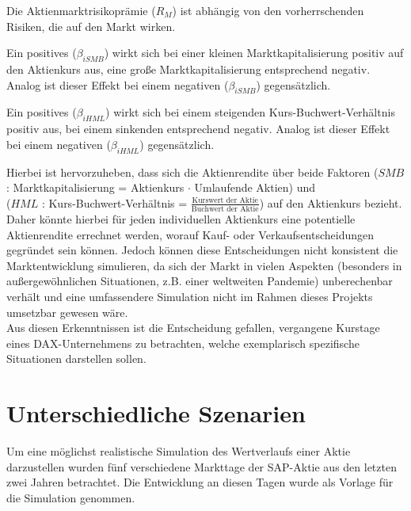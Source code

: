Die Aktienmarktrisikoprämie ($R_M$) ist abhängig von den vorherrschenden Risiken, die auf den Markt wirken. 

Ein positives ($\beta_{iSMB}$) wirkt sich bei einer kleinen Marktkapitalisierung positiv auf den Aktienkurs aus, eine große Marktkapitalisierung entsprechend negativ. Analog ist dieser Effekt bei einem negativen ($\beta_{iSMB}$) gegensätzlich.

Ein positives ($\beta_{iHML}$) wirkt sich bei einem steigenden Kurs-Buchwert-Verhältnis positiv aus, bei einem sinkenden entsprechend negativ. Analog ist dieser Effekt bei einem negativen ($\beta_{iHML}$) gegensätzlich.

Hierbei ist hervorzuheben, dass sich die Aktienrendite über beide Faktoren ($SMB$ : Marktkapitalisierung = Aktienkurs $\cdot$ Umlaufende Aktien) und \\
($HML$ : Kurs-Buchwert-Verhältnis = $\frac{\text{Kurswert der Aktie}}{\text{Buchwert der Aktie}} $) auf den Aktienkurs bezieht. Daher könnte hierbei für jeden individuellen Aktienkurs eine potentielle Aktienrendite errechnet werden, worauf Kauf- oder Verkaufsentscheidungen gegründet sein können. Jedoch können diese Entscheidungen nicht konsistent die Marktentwicklung simulieren, da sich der Markt in vielen Aspekten (besonders in außergewöhnlichen Situationen, z.B. einer weltweiten Pandemie) unberechenbar verhält und eine umfassendere Simulation nicht im Rahmen dieses Projekts umsetzbar gewesen wäre.\\
Aus diesen Erkenntnissen ist die Entscheidung gefallen, vergangene Kurstage eines DAX-Unternehmens zu betrachten, welche exemplarisch spezifische Situationen darstellen sollen.

\section{Unterschiedliche Szenarien}

Um eine möglichst realistische Simulation des Wertverlaufs einer Aktie darzustellen wurden fünf verschiedene Markttage der SAP-Aktie aus den letzten zwei Jahren betrachtet. Die Entwicklung an diesen Tagen wurde als Vorlage für die Simulation genommen.

